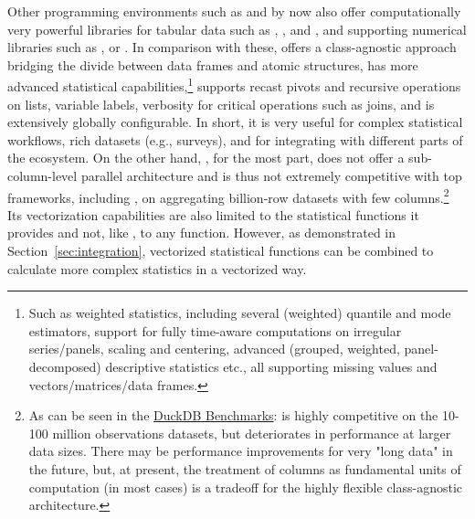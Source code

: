 \documentclass[article]{jss} %
\begin{document}
Other programming environments such as  and  by now also offer computationally very powerful libraries for tabular data such as  \citep{jldataframes},  \citep{pypolars}, and  \citep{mckinney2010pandas, pypandas}, and supporting numerical libraries such as  \citep{pynumpy}, or  \citep{jlstatsbase}. %
In comparison with these,  offers a class-agnostic approach bridging the divide between data frames and atomic structures, has more advanced statistical capabilities,\footnote{Such as weighted statistics, including several (weighted) quantile and mode estimators, support for fully time-aware computations on irregular series/panels, scaling and centering, advanced (grouped, weighted, panel-decomposed) descriptive statistics etc., all supporting missing values and vectors/matrices/data frames.} supports recast pivots and recursive operations on lists, variable labels, verbosity for critical operations such as joins, and is extensively globally configurable. In short, it is very useful for complex statistical workflows, rich datasets (e.g., surveys), and for integrating with different parts of the  ecosystem. On the other hand, , for the most part, does not offer a sub-column-level parallel architecture and is thus not extremely competitive with top frameworks, including , on aggregating billion-row datasets with few columns.\footnote{As can be seen in the \href{https://duckdblabs.github.io/db-benchmark/}{DuckDB Benchmarks}:  is highly competitive on the 10-100 million observations datasets, but deteriorates in performance at larger data sizes. There may be performance improvements for very "long data" in the future, but, at present, the treatment of columns as fundamental units of computation (in most cases) is a tradeoff for the highly flexible class-agnostic architecture.} Its vectorization capabilities are also limited to the statistical functions it provides and not, like , to any  function. However, as demonstrated in Section~\ref{sec:integration}, vectorized statistical functions can be combined to calculate more complex statistics in a vectorized way. \newline
\end{document}
